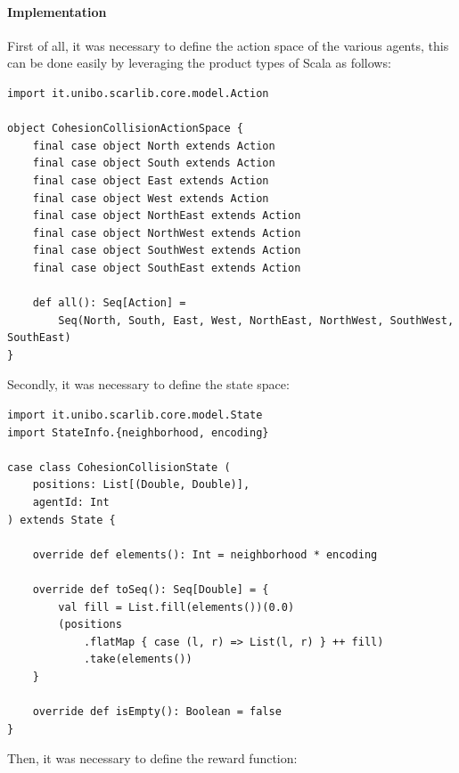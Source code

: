 \documentclass[12pt,a4paper,openright,twoside]{book}
\begin{document}
\paragraph{Implementation}
First of all, it was necessary to define the action space of the various agents, this can be done easily by leveraging the product types of Scala as follows:
\begin{lstlisting}
import it.unibo.scarlib.core.model.Action

object CohesionCollisionActionSpace {
    final case object North extends Action
    final case object South extends Action
    final case object East extends Action
    final case object West extends Action
    final case object NorthEast extends Action
    final case object NorthWest extends Action
    final case object SouthWest extends Action
    final case object SouthEast extends Action

    def all(): Seq[Action] =
        Seq(North, South, East, West, NorthEast, NorthWest, SouthWest, SouthEast)
}
\end{lstlisting}
Secondly, it was necessary to define the state space:
\begin{lstlisting}
import it.unibo.scarlib.core.model.State
import StateInfo.{neighborhood, encoding}

case class CohesionCollisionState (
    positions: List[(Double, Double)], 
    agentId: Int
) extends State {
  
    override def elements(): Int = neighborhood * encoding

    override def toSeq(): Seq[Double] = {
        val fill = List.fill(elements())(0.0)
        (positions
            .flatMap { case (l, r) => List(l, r) } ++ fill)
            .take(elements())
    }

    override def isEmpty(): Boolean = false
}
\end{lstlisting}
Then, it was necessary to define the reward function:
\end{document}
